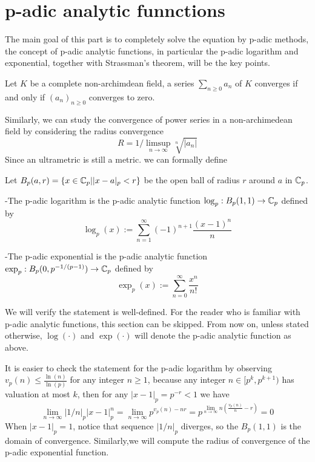 \section{p-adic analytic funnctions}

The main goal of this part is to completely solve the equation by p-adic methods, the concept of p-adic analytic functions, in particular the p-adic logarithm and exponential, together with Strassman's theorem, will be the key points.

\begin{proposition}
    Let \(K\) be a complete non-archimdean field, a series \(\sum_{n \geq 0} a_n\) of \(K\) converges if and only if \((a_n)_{n \geq 0}\) converges to zero.
\end{proposition}

Similarly, we can study the convergence of power series in a non-archimedean field by considering the radius convergence
\[R = 1/\limsup_{n \rightarrow \infty}\sqrt[n]{|a_n|}\]
Since an ultrametric is still a metric. we can formally define 
\begin{definition}
    Let \(B_p(a,r) = \{x \in \mathbb{C}_p| |x-a|_p <r \}\) be  the open ball of radius \(r\) around \(a\) in \(\mathbb{C}_p\).

    -The p-adic logarithm is the p-adic analytic function \(\log_p: B_p(1,1) \to \mathbb{C}_p\) defined by
    \[\log_p(x) := \sum_{n=1}^{\infty} (-1)^{n+1} \frac{(x-1)^n}{n}\]

    -The p-adic exponential is the p-adic analytic function \(\exp_p : B_p(0,p^{-1/(p-1)}) \to \mathbb{C}_p\) defined by
    \[\exp_p (x) :=  \sum_{n=0}^{\infty} \frac{x^n}{n!}\]
\end{definition}

We will verify the statement is well-defined. For the reader who is familiar with p-adic analytic functions, this section can be skipped. From now on, unless stated otherwise, \(\log(\cdot)\) and \(\exp(\cdot)\) will denote the p-adic analytic function as above. \newline 

It is easier to check the statement for the p-adic logarithm by observing \(v_p(n) \leq \frac{\ln(n)}{\ln(p)}\) for any integer \(n \geq 1\), because any integer \(n \in [p^k,p^{k+1})\) has valuation at most \(k\), then for any \(|x-1|_p = p^{-r} < 1\) we have
\[ \lim_{n \rightarrow \infty} |1/n|_p |x-1|_p^n =\lim_{n \rightarrow \infty} p^{v_p(n)-nr} = p^{\lim_{n \rightarrow \infty}n(\frac{v_p(n)}{n}-r)} = 0\]
When \(|x-1|_p = 1\), notice that sequence \(|1/n|_p\) diverges, so the \(B_p(1,1)\) is the domain of convergence. Similarly,we will compute the radius of convergence of the p-adic exponential function.

